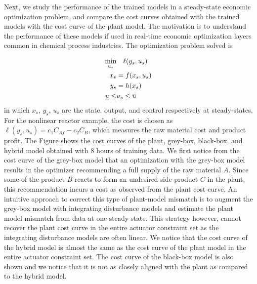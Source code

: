 \documentclass{article}
\begin{document}
Next, we study the performance of the trained models in a steady-state economic
optimization problem, and compare the cost curves obtained with the trained
models with the cost curve of the plant model. The motivation is to understand
the performance of these models if used in real-time economic optimization
layers common in chemical process industries. The optimization problem solved is

\begin{align*}
  \underset{u_s}{\textnormal{min}} & \quad \ell(y_s, u_s) \\
  x_s &= f(x_s, u_s)\\ 
  y_s &= h(x_s) \\
  \underline{u} \leq &u_s \leq \overline{u}
\end{align*}
in which $x_s$, $y_s$, $u_s$ are the state, output, and control respectively at
steady-states. For the nonlinear reactor example, the cost is chosen as
$\ell(y_s, u_s) = c_1C_{Af} - c_2C_B$, which measures the raw material cost and
product profit. The Figure shows the cost curves of the
plant, grey-box, black-box, and hybrid model obtained with 8 hours of training
data. We first notice from the cost curve of the grey-box model that an
optimization with the grey-box model results in the optimizer recommending a
full supply of the raw material $A$. Since some of the product $B$ reacts to
form an undesired side product $C$ in the plant, this recommendation incurs a
cost as observed from the plant cost curve. An intuitive approach to correct
this type of plant-model mismatch is to augment the grey-box model with
integrating disturbance models and estimate the plant model mismatch from data
at one steady state. This strategy however, cannot recover the plant cost curve
in the entire actuator constraint set as the integrating disturbance models are
often linear. We notice that the cost curve of the hybrid model is almost the
same as the cost curve of the plant model in the entire actuator constraint set.
The cost curve of the black-box model is also shown and we notice that it is not
as closely aligned with the plant as compared to the hybrid model.
\end{document}
